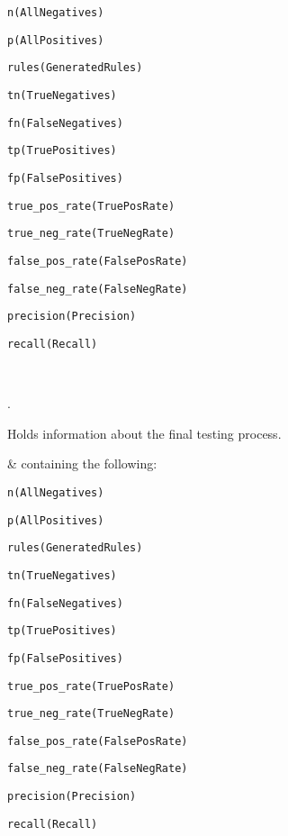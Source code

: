 \documentclass[11pt]{article}
\begin{document}
\begin{description}
\begin{arguments}
\begin{shortlist}
    \item \verb$n(AllNegatives)$
    \item \verb$p(AllPositives)$
    \item \verb$rules(GeneratedRules)$
    \item \verb$tn(TrueNegatives)$
    \item \verb$fn(FalseNegatives)$
    \item \verb$tp(TruePositives)$
    \item \verb$fp(FalsePositives)$
    \item \verb$true_pos_rate(TruePosRate)$
    \item \verb$true_neg_rate(TrueNegRate)$
    \item \verb$false_pos_rate(FalsePosRate)$
    \item \verb$false_neg_rate(FalseNegRate)$
    \item \verb$precision(Precision)$
    \item \verb$recall(Recall)$
\end{shortlist}

 \\
\end{arguments}

\begin{tags}
.
\end{tags}

Holds information about the final testing process.

\begin{arguments}
 &  containing the following:

\begin{shortlist}
    \item \verb$n(AllNegatives)$
    \item \verb$p(AllPositives)$
    \item \verb$rules(GeneratedRules)$
    \item \verb$tn(TrueNegatives)$
    \item \verb$fn(FalseNegatives)$
    \item \verb$tp(TruePositives)$
    \item \verb$fp(FalsePositives)$
    \item \verb$true_pos_rate(TruePosRate)$
    \item \verb$true_neg_rate(TrueNegRate)$
    \item \verb$false_pos_rate(FalsePosRate)$
    \item \verb$false_neg_rate(FalseNegRate)$
    \item \verb$precision(Precision)$
    \item \verb$recall(Recall)$
\end{shortlist}


\end{arguments}
\end{description}
\end{document}
